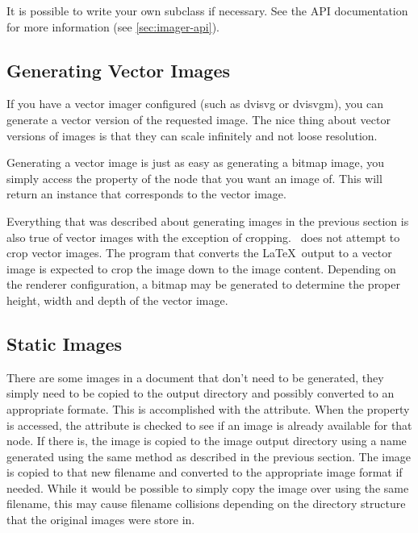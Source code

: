 It is possible to write your own  subclass if necessary.
See the  API documentation for more information (see
\ref{sec:imager-api}).


\subsection{Generating Vector Images}

If you have a vector imager configured (such as dvisvg or dvisvgm), you
can generate a vector version of the requested image. The nice thing about
vector versions of images is that they can scale infinitely and not loose
resolution.

Generating a vector image is just as easy as generating a bitmap image,
you simply access the  property of the node that
you want an image of.  This will return an 
instance that corresponds to the vector image.

Everything that was described about generating images in the previous
section is also true of vector images with the exception of cropping.
\plasTeX\ does not attempt to crop vector images.  The program that
converts the \LaTeX\ output to a vector image is expected to crop the
image down to the image content.  Depending on the renderer configuration, a
bitmap may be generated to determine the proper height, width and depth of
the vector image.


\subsection{Static Images}

There are some images in a document that don't need to be generated, they
simply need to be copied to the output directory and possibly converted
to an appropriate formate.  This is accomplished with the
 attribute.  When the  property
is accessed, the  attribute is checked to see if
an image is already available for that node.  If there is, the image
is copied to the image output directory using a name generated
using the same method as described in the previous section.  The image
is copied to that new filename and converted to the appropriate
image format if needed.  While it would be possible to simply copy the
image over using the same filename, this may cause filename collisions
depending on the directory structure that the original images were
store in.

